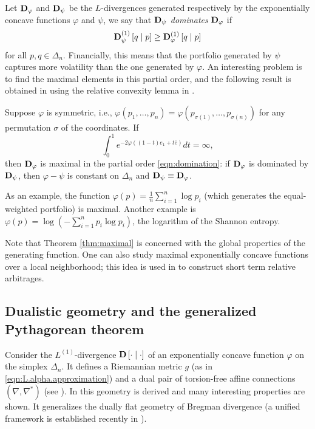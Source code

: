 \documentclass[graybox]{svmult}
\begin{document}
Let ${\bf D}_{\varphi}$ and ${\bf D}_{\psi}$ be the $L$-divergences generated respectively by the exponentially concave functions $\varphi$ and $\psi$, we say that ${\bf D}_{\psi}$ {\it dominates} ${\bf D}_{\varphi}$ if 
\begin{equation} \label{eqn:domination}
{\bf D}^{(1)}_{\psi}\left[ q \mid p\right] \geq {\bf D}^{(1)}_{\varphi}\left[ q \mid p\right]
\end{equation}
for all $p, q \in \Delta_n$. Financially, this means that the portfolio generated by $\psi$ captures more volatility than the one generated by $\varphi$. An interesting problem is to find the maximal elements in this partial order, and the following result is obtained in \cite{W15} using the relative convexity lemma in \cite{CDO07}.

\begin{theorem} \label{thm:maximal}
Suppose $\varphi$ is symmetric, i.e., $\varphi(p_1, \ldots, p_n) = \varphi(p_{\sigma(1)}, \ldots, p_{\sigma(n)})$ for any permutation $\sigma$ of the coordinates. If
\[
\int_0^1 e^{-2 \varphi((1 - t) e_1 + t \overline{e})} dt = \infty,
\]
then ${\bf D}_{\varphi}$ is maximal in the partial order \eqref{eqn:domination}: if ${\bf D}_{\varphi}$ is dominated by ${\bf D}_{\psi}$, then $\varphi - \psi$ is constant on $\Delta_n$ and ${\bf D}_{\psi} \equiv {\bf D}_{\varphi}$.
\end{theorem}

As an example, the function $\varphi(p) = \frac{1}{n} \sum_{i = 1}^n \log p_i$ (which generates the equal-weighted portfolio) is maximal. Another example is $\varphi(p) = \log \left( -\sum_{i = 1}^n p_i \log p_i\right)$, the logarithm of the Shannon entropy.

Note that Theorem \ref{thm:maximal} is concerned with the global properties of the generating function. One can also study maximal exponentially concave functions over a local neighborhood; this idea is used in \cite{P17} to construct short term relative arbitrages.



\subsection{Dualistic geometry and the generalized Pythagorean theorem} \label{sec:pyth}
Consider the $L^{(1)}$-divergence ${\bf D}\left[ \cdot \mid \cdot\right]$ of an exponentially concave function $\varphi$ on the simplex $\Delta_n$. It defines a Riemannian metric $g$ (as in \eqref{eqn:L.alpha.approximation}) and a dual pair of torsion-free affine connections $(\nabla, \nabla^*)$ (see \cite[Chapter 6]{A16}). In \cite{PW16} this geometry is derived and many interesting properties are shown. It generalizes the dually flat geometry of Bregman divergence (a unified framework is established recently in \cite{W17b}). 
\end{document}
